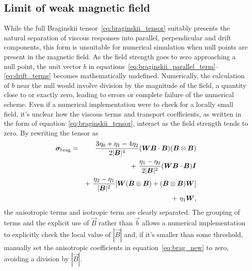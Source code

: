 \subsection{Limit of weak magnetic field}

While the full Braginskii tensor~\ref{eq:braginskii_tensor} suitably presents the natural separation of viscous responses into parallel, perpendicular and drift components, this form is unsuitable for numerical simulation when null points are present in the magnetic field. As the field strength goes to zero approaching a null point, the unit vector $b$ in equations~\ref{eq:braginskii_parallel_term}--\ref{eq:drift_terms} becomes mathematically undefined. Numerically, the calculation of $b$ near the null would involve division by the magnitude of the field, a quantity close to or exactly zero, leading to errors or complete failure of the numerical scheme. Even if a numerical implementation were to check for a locally small field, it's unclear how the viscous terms and transport coefficients, as written in the form of equation~\ref{eq:braginskii_tensor}, interact as the field strength tends to zero. By rewriting the tensor as
\begin{eqnarray}\label{eq:brag_new}
\ten{\sigma}_{\rm brag} = &&\frac{3\eta_0+\eta_1-4\eta_2}{2|\vec{B}|^4}(\ten{W}\vec{B}\cdot\vec{B})(\vec{B}\otimes\vec{B})\\%
\nonumber
& &+~ \frac{\eta_1-\eta_0}{2|\vec{B}|^2}(\ten{W}\vec{B}\cdot\vec{B})\ten{I}\\%
\nonumber
& &+~ \frac{\eta_2-\eta_1}{|\vec{B}|^2}[\ten{W}(\vec{B}\otimes\vec{B})+(\vec{B}\otimes\vec{B})\ten{W}] \\%
\nonumber
& &+~ \eta_1\ten{W},%
\end{eqnarray}
the anisotropic terms and isotropic term are clearly separated. The grouping of terms and the explicit use of $\vec{B}$ rather than $\vec{b}$ allows a numerical implementation to explicitly check the local value of $|\vec{B}|$ and, if it's smaller than some threshold, manually set the anisotropic coefficients in equation~\ref{eq:brag_new} to zero, avoiding a division by $|\vec{B}|$.


